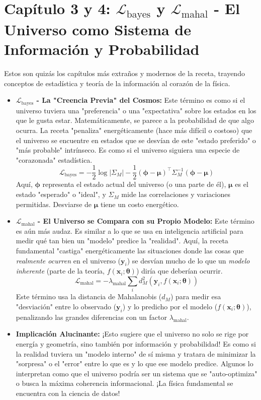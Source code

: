 \section*{\centering Capítulo 3 y 4: $\mathcal{L}_{\text{bayes}}$ y $\mathcal{L}_{\text{mahal}}$ - El Universo como Sistema de Información y Probabilidad}

Estos son quizás los capítulos más extraños y modernos de la receta, trayendo conceptos de estadística y teoría de la información al corazón de la física.

\begin{itemize}
    \item \textbf{$\mathcal{L}_{\text{bayes}}$ - La "Creencia Previa" del Cosmos:} Este término es como si el universo tuviera una "preferencia" o una "expectativa" sobre los estados en los que le gusta estar. Matemáticamente, se parece a la probabilidad de que algo ocurra. La receta "penaliza" energéticamente (hace más difícil o costoso) que el universo se encuentre en estados que se desvían de este "estado preferido" o "más probable" intrínseco. Es como si el universo siguiera una especie de "corazonada" estadística.
    \[
    \mathcal{L}_{\text{bayes}} = -\frac{1}{2}\log|\Sigma_M| - \frac{1}{2}(\bm{\phi} - \bm{\mu})^{\top}\Sigma_M^{-1}(\bm{\phi} - \bm{\mu})
    \]
    Aquí, $\bm{\phi}$ representa el estado actual del universo (o una parte de él), $\bm{\mu}$ es el estado "esperado" o "ideal", y $\Sigma_M$ mide las correlaciones y variaciones permitidas. Desviarse de $\bm{\mu}$ tiene un costo energético.
    \item \textbf{$\mathcal{L}_{\text{mahal}}$ - El Universo se Compara con su Propio Modelo:} Este término es aún más audaz. Es similar a lo que se usa en inteligencia artificial para medir qué tan bien un "modelo" predice la "realidad". Aquí, la receta fundamental "castiga" energéticamente las situaciones donde las cosas que \textit{realmente ocurren} en el universo ($\mathbf{y}_i$) se desvían mucho de lo que un \textit{modelo inherente} (parte de la teoría, $f(\mathbf{x}_i; \boldsymbol{\theta})$) diría que deberían ocurrir.
    \[
    \mathcal{L}_{\text{mahal}} = -\lambda_{\text{mahal}}\sum_i d_M^2(\mathbf{y}_i, f(\mathbf{x}_i; \boldsymbol{\theta}))
    \]
    Este término usa la distancia de Mahalanobis ($d_M$) para medir esa "desviación" entre lo observado ($\mathbf{y}_i$) y lo predicho por el modelo ($f(\mathbf{x}_i; \boldsymbol{\theta})$), penalizando las grandes diferencias con un factor $\lambda_{\text{mahal}}$.
    \item \textbf{Implicación Alucinante:} ¡Esto sugiere que el universo no solo se rige por energía y geometría, sino también por información y probabilidad! Es como si la realidad tuviera un "modelo interno" de sí misma y tratara de minimizar la "sorpresa" o el "error" entre lo que es y lo que ese modelo predice. Algunos lo interpretan como que el universo podría ser un sistema que se "auto-optimiza" o busca la máxima coherencia informacional. ¡La física fundamental se encuentra con la ciencia de datos!
\end{itemize}

